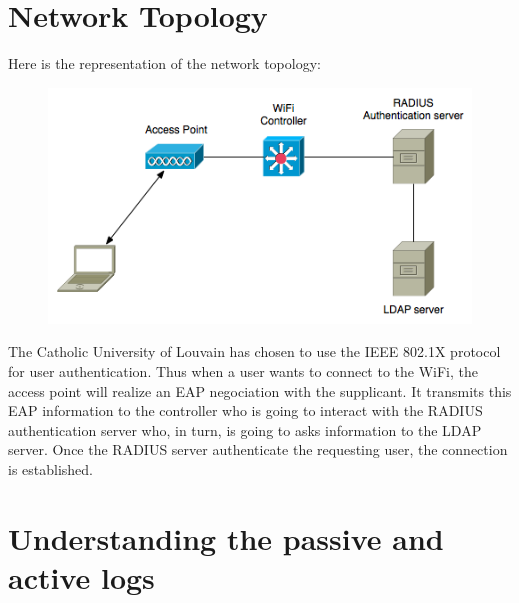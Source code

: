 \section{Network Topology}
Here is the representation of the network topology:
\begin{figure}[H]
	\includegraphics[width=.9\linewidth]{Pictures/Chapter2/topology.png}
\end{figure}
The Catholic University of Louvain has chosen to use the IEEE 802.1X protocol for user authentication. Thus when a user wants to connect to the WiFi, the access point will realize an EAP negociation with the supplicant. It transmits this EAP information to the controller who is going to interact with the RADIUS authentication server who, in turn, is going to asks information to the LDAP server. Once the RADIUS server authenticate the requesting user, the connection is established.




\section{Understanding the passive and active logs}